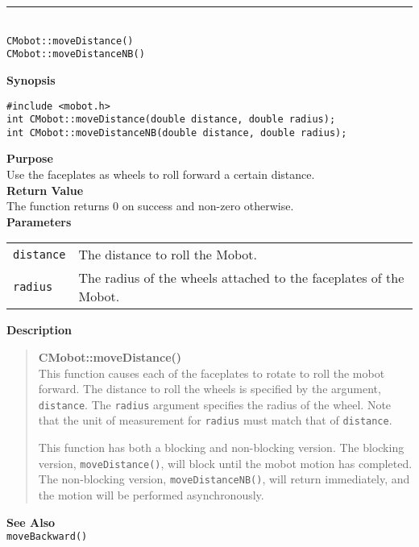 \noindent
\vspace{5pt}
\rule{4.5in}{0.015in}\\
\noindent
{\LARGE \texttt{CMobot::moveDistance()}}\\
{\LARGE \texttt{CMobot::moveDistanceNB()}}\\
{}

\noindent
{\bf Synopsis}
\vspace{-8pt}
\begin{verbatim}
#include <mobot.h>
int CMobot::moveDistance(double distance, double radius);
int CMobot::moveDistanceNB(double distance, double radius);
\end{verbatim}

\noindent
{\bf Purpose}\\
Use the faceplates as wheels to roll forward a certain distance.\\

\noindent
{\bf Return Value}\\
The function returns 0 on success and non-zero otherwise.\\

\noindent
{\bf Parameters}\\
\vspace{-0.1in}
\begin{description}
\item               
\begin{tabular}{p{15 mm}p{145 mm}}
\texttt{distance} & The distance to roll the Mobot.\\
\texttt{radius} & The radius of the wheels attached to the faceplates of the Mobot.\\
\end{tabular}
\end{description}

\noindent
{\bf Description}\\
\vspace{-12pt}
\begin{quote}
{\bf CMobot::moveDistance()}\\
This function causes each of the faceplates to rotate to roll the
mobot forward. The distance to roll the wheels is specified by the argument,
\texttt{distance}. The \texttt{radius} argument specifies the radius of the wheel.
Note that the unit of measurement for \texttt{radius} must match that of
\texttt{distance}. 

This function has both a blocking and non-blocking version.
The blocking version, \texttt{moveDistance()}, will block until the
mobot motion has completed. The non-blocking version, \texttt{moveDistanceNB()},
will return immediately, and the motion will be performed asynchronously.\\
\end{quote}

\noindent
{\bf See Also}\\
\texttt{moveBackward()}

